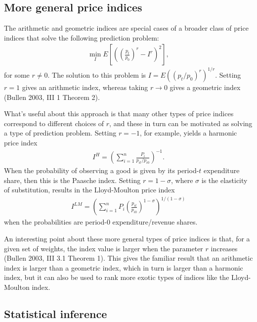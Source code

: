 \documentclass[
]{article}
\begin{document}
\hypertarget{more-general-price-indices}{%
\subsection{More general price indices}\label{more-general-price-indices}}

The arithmetic and geometric indices are special cases of a broader class of price indices that solve the following prediction problem:
\begin{align*}
\min_{I} E\left[\left(\left(\frac{p_{t}}{p_{0}}\right)^{r} - I^{r} \right)^{2}\right],
\end{align*}
for some \(r \neq 0\). The solution to this problem is \(I = E((p_{t} / p_{0})^{r})^{1 / r}\). Setting \(r = 1\) gives an arithmetic index, whereas taking \(r \rightarrow 0\) gives a geometric index (Bullen 2003, III 1 Theorem 2).

What's useful about this approach is that many other types of price indices correspond to different choices of \(r\), and these in turn can be motivated as solving a type of prediction problem. Setting \(r = -1\), for example, yields a harmonic price index
\begin{align*}
I^{H} = \left(\sum_{i = 1}^{n} \frac{P_{i}}{p_{it} / p_{i0}} \right)^{-1}.
\end{align*}
When the probability of observing a good is given by its period-\(t\) expenditure share, then this is the Paasche index. Setting \(r = 1 - \sigma\), where \(\sigma\) is the elasticity of substitution, results in the Lloyd-Moulton price index
\begin{align*}
I^{LM} = \left(\sum_{i = 1}^{n} P_{i} \left(\frac{p_{it}}{p_{i0}}\right)^{1 - \sigma}\right)^{1 / (1 - \sigma)}
\end{align*}
when the probabilities are period-0 expenditure/revenue shares.

An interesting point about these more general types of price indices is that, for a given set of weights, the index value is larger when the parameter \(r\) increases (Bullen 2003, III 3.1 Theorem 1). This gives the familiar result that an arithmetic index is larger than a geometric index, which in turn is larger than a harmonic index, but it can also be used to rank more exotic types of indices like the Lloyd-Moulton index.

\hypertarget{statistical-inference}{%
\subsection{Statistical inference}\label{statistical-inference}}
\end{document}
